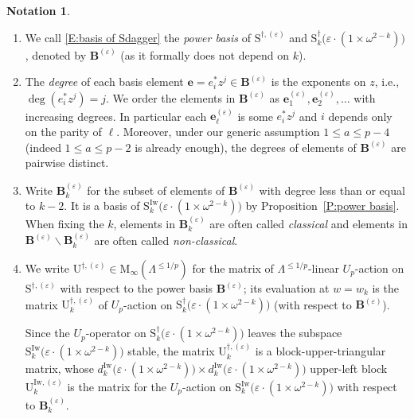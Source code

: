 \documentclass[12pt]{amsart}
\makeatletter
\theoremstyle{definition}
\newtheorem{notation}[subsection]{Notation}
\numberwithin{equation}{subsection}
\newcommand{\fakephantomsection}{%
  \Hy@MakeCurrentHref{\@currenvir.\the\Hy@linkcounter}
  \Hy@raisedlink{\hyper@anchorstart{\@currentHref}\hyper@anchorend}%
}
\def\bfB{\mathbf{B}}
\def\bfe{\mathbf{e}}
\def\rmM{\mathrm{M}}
\def\rmU{\mathrm{U}}
\def\rmS{\mathrm{S}}
\newcommand{\Iw}{\mathrm{Iw}}
\makeatother
\begin{document}
\begin{notation}\fakephantomsection
\label{N:power basis}
\begin{enumerate}
\item 
We call \eqref{E:basis of Sdagger} the \emph{power basis} of $\rmS^{\dagger, (\varepsilon)}$ and  $\rmS_{k}^{\dagger}\big(\varepsilon\cdot (1\times \omega^{2-k})\big)$, denoted by $\bfB^{ (\varepsilon)}$ (as it formally does not depend on $k$).
\item 
The \emph{degree} of each basis element $\bfe = e_i^*z^j \in \bfB^{ (\varepsilon)}$ is the exponents on $z$, i.e., $\deg (e_i^*z^j) = j$.
We order the elements in $\bfB^{(\varepsilon)}$ as $\bfe_1^{(\varepsilon)}, \bfe_2^{(\varepsilon)}, \dots$ with increasing degrees. In particular each $\bfe_\ell^{(\varepsilon)}$ is some $e_i^*z^j$ and $i$ depends only on the parity of $\ell$.
Moreover, under our generic assumption $1\leq a \leq p-4$ (indeed $1\leq a \leq p-2$ is already enough), the degrees of elements of $\bfB^{ (\varepsilon)}$ are pairwise distinct.
\item 
Write $ \bfB_{k}^{(\varepsilon)} $ for the subset of elements of $\bfB^{(\varepsilon)}$ with degree less than or equal to $k-2$. It is a basis of $\rmS_{k}^\Iw\big(\varepsilon\cdot (1\times \omega^{2-k})\big)$ by Proposition~\ref{P:power basis}. When fixing the $k$, elements in $\bfB_k^{(\varepsilon)}$ are often called \emph{classical} and elements in $\bfB^{(\varepsilon)} \backslash \bfB_k^{(\varepsilon)}$ are often called \emph{non-classical}.

\item
We write $\rmU^{\dagger,(\varepsilon)} \in \rmM_\infty(\Lambda^{\leq 1/p})$ for the matrix of $\Lambda^{\leq 1/p}$-linear $U_p$-action on $\rmS^{\dagger,(\varepsilon)}$ with respect to the power basis $\bfB^{(\varepsilon)}$; its evaluation at $w = w_k$ is the matrix $\rmU_k^{\dagger, (\varepsilon)}$ of $U_p$-action on $\rmS_k^\dagger\big(\varepsilon\cdot(1\times \omega^{2-k})\big)$ (with respect to $\bfB^{ (\varepsilon)}$).

Since the $U_p$-operator on $\rmS_k^\dagger\big(\varepsilon\cdot(1\times \omega^{2-k})\big)$ leaves the subspace $\rmS_{k}^\Iw\big(\varepsilon\cdot (1\times \omega^{2-k})\big)$ stable, the matrix $\rmU^{\dagger, (\varepsilon)}_k$ is a block-upper-triangular matrix, whose $d_k^\Iw\big(\varepsilon\cdot (1\times \omega^{2-k})\big) \times d_k^\Iw\big(\varepsilon\cdot (1\times \omega^{2-k})\big)$ upper-left block $\rmU^{\Iw, (\varepsilon)}_k$ is the matrix for the $U_p$-action on $\rmS_{k}^\Iw\big(\varepsilon\cdot (1\times \omega^{2-k})\big)$ with respect to $\bfB_k^{ (\varepsilon)}$.

\end{enumerate}
\end{notation}
\end{document}
